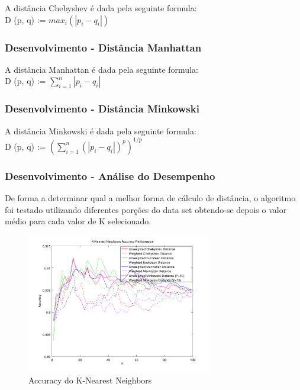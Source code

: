 \documentclass[portugues,final]{revdetua}
\begin{document}
A distância Chebyshev é dada pela seguinte formula:\\

D (p, q) := $max_i(|p_i - q_i|)$\\

\subsubsection{Desenvolvimento - Distância Manhattan}

A distância Manhattan é dada pela seguinte formula:\\

D (p, q) := $\sum_{i=1}^{n}|p_i - q_i|$\\

\subsubsection{Desenvolvimento - Distância Minkowski}

A distância Minkowski é dada pela seguinte formula:\\

D (p, q) := $(\sum_{i=1}^{n}(|p_i - q_i|)^p)^{1/p}$\\

\subsubsection{Desenvolvimento - Análise do Desempenho}

De forma a determinar qual a melhor forma de cálculo de distância, o algoritmo foi testado utilizando diferentes porções do data set obtendo-se depois o valor médio para cada valor de K selecionado.\\

\begin{figure}[H]
\centerline{\includegraphics[width=230pt]{images/knn_graph_accuracy.png}}
\caption{Accuracy do K-Nearest Neighbors}
\label{img:complete}
\end{figure}
\end{document}
